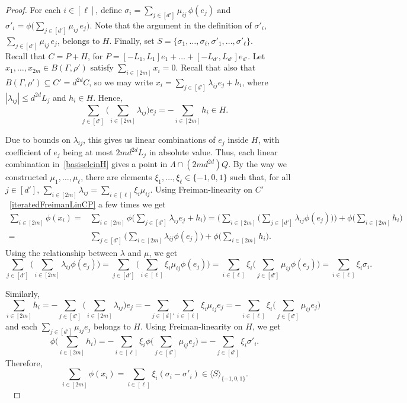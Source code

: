 \documentclass[a4paper,11pt]{article}
\numberwithin{theorem}{section}
\theoremstyle{definition}
\begin{document}
\begin{proof}
    For each $i \in [\ell]$, define $\sigma_i = \sum_{j \in [d']} \mu_{ij}\,\phi(e_j)$ and $\sigma'_i = \phi\Big(\sum_{j \in [d']} \mu_{ij}\,e_j\Big)$. Note that the argument in the definition of $\sigma'_i$, $\sum_{j \in [d']} \mu_{ij}\,e_j$, belongs to $H$. Finally, set $S = \{\sigma_1, \dots, \sigma_\ell, \sigma'_1, \dots, \sigma'_\ell\}$.\\
    
    Recall that $C = P + H$, for $P = [-L_1, L_1]e_1 + \dots + [-L_{d'}, L_{d'}]e_{d'}$. Let $x_1, \dots, x_{2m} \in B(\Gamma, \rho')$ satisfy $\sum_{i \in [2m]} x_i = 0$. Recall that also that $B(\Gamma, \rho') \subseteq C' = d^{2d}C$, so we may write $x_i = \sum_{j \in [d']} \lambda_{ij} e_j + h_i$, where $|\lambda_{ij}| \leq d^{2d} L_j$ and $h_i \in H$. Hence,
    \begin{equation}\sum_{j \in [d']} \Big(\sum_{i \in [2m]} \lambda_{ij}\Big) e_j = -\sum_{i \in [2m]} h_i \in H.\label{basiselcinH}\end{equation}
    
    Due to bounds on $\lambda_{ij}$, this gives us linear combinations of $e_j$ inside $H$, with coefficient of $e_j$ being at most $2m d^{2d} L_j$ in absolute value. Thus, each linear combination in~\eqref{basiselcinH} gives a point in $\Lambda \cap (2m d^{2d})Q$. By the way we constructed $\mu_1, \dots, \mu_\ell$, there are elements $\xi_1, \dots, \xi_\ell \in \{-1, 0, 1\}$ such that, for all $j \in [d']$, $\sum_{i \in [2m]} \lambda_{ij} = \sum_{i \in [\ell]} \xi_i \mu_{i j}$. Using Freiman-linearity on $C'$~\eqref{iteratedFreimanLinCP} a few times we get
    \begin{align*}\sum_{i \in [2m]} \phi(x_i) = &\sum_{i \in [2m]} \phi\Big(\sum_{j \in [d']} \lambda_{ij}e_j + h_i\Big) = \bigg(\sum_{i \in [2m]} \Big(\sum_{j \in [d']} \lambda_{ij} \phi(e_j)\Big)\bigg) + \phi\Big(\sum_{i \in [2m]} h_i\Big) \\
    = &\sum_{j \in [d']} \Big(\sum_{i \in [2m]}  \lambda_{ij} \phi(e_j)\Big)+ \phi\Big(\sum_{i \in [2m]} h_i\Big) .\end{align*}
    Using the relationship between $\lambda$ and $\mu$, we get
    \[\sum_{j \in [d']} \Big(\sum_{i \in [2m]}  \lambda_{ij} \phi(e_j)\Big) = \sum_{j \in [d']} \Big(\sum_{i \in [\ell]}  \xi_i \mu_{ij} \phi(e_j)\Big) =  \sum_{i \in [\ell]} \xi_i  \Big(  \sum_{j \in [d']}\mu_{ij} \phi(e_j)\Big) = \sum_{i \in [\ell]} \xi_i  \sigma_i.\]

    Similarly, 
    \[\sum_{i \in [2m]} h_i = -\sum_{j \in [d']} \Big(\sum_{i \in [2m]} \lambda_{ij}\Big) e_j = -\sum_{j \in [d]'} \sum_{i \in [\ell]} \xi_i \mu_{i j} e_j = - \sum_{i \in [\ell]}\xi_i  \Big(\sum_{j \in [d']} \mu_{ij} e_j\Big)\]
    and each $\sum_{j \in [d']} \mu_{ij} e_j$ belongs to $H$. Using Freiman-linearity on $H$, we get
    \[\phi\Big(\sum_{i \in [2m]} h_i \Big) = - \sum_{i \in [\ell]}\xi_i \phi\Big(\sum_{j \in [d']} \mu_{ij} e_j\Big) = - \sum_{j \in [d']} \xi_i \sigma'_i.\]
    Therefore, 
    \begin{equation}\sum_{i \in [2m]} \phi(x_i) = \sum_{i \in [\ell]} \xi_i (\sigma_i - \sigma'_i) \in \langle S \rangle_{\{-1, 0, 1\}}.\label{generalextensionscocycleapprox}\end{equation}\


\end{proof}
\end{document}
